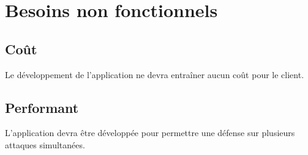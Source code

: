 
\section{Besoins non fonctionnels}







\subsection{Coût}Le développement de l'application ne devra entraîner aucun coût pour le client.

\subsection{Performant}L'application devra être développée pour permettre une défense sur plusieurs attaques simultanées.

